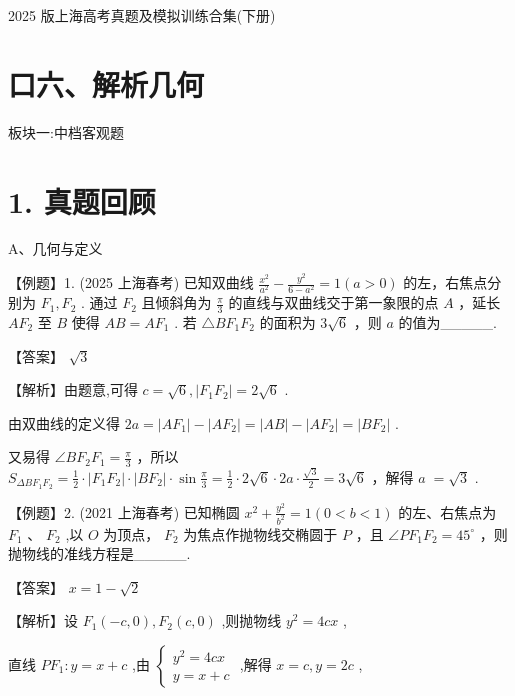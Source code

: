 \documentclass[10pt]{article}
\begin{document}
2025 版上海高考真题及模拟训练合集(下册)

\section*{口六、解析几何}

板块一:中档客观题

\section*{1. 真题回顾}

A、几何与定义

【例题】1. (2025 上海春考) 已知双曲线 \(\frac{{x}^{2}}{{a}^{2}} - \frac{{y}^{2}}{6 - {a}^{2}} = 1\left( {a > 0}\right)\) 的左，右焦点分别为 \({F}_{1},{F}_{2}\) . 通过 \({F}_{2}\) 且倾斜角为 \(\frac{\pi }{3}\) 的直线与双曲线交于第一象限的点 \(A\) ，延长 \(A{F}_{2}\) 至 \(B\) 使得 \({AB} = {A{F}_{1}}\) . 若 \(\bigtriangleup B{F}_{1}{F}_{2}\) 的面积为 \(3\sqrt{6}\) ，则 \(a\) 的值为\_\_\_\_\_.

【答案】 \(\sqrt{3}\)

【解析】由题意,可得 \(c = \sqrt{6},\left| {{F}_{1}{F}_{2}}\right|  = 2\sqrt{6}\) .

由双曲线的定义得 \({2a} = \left| {A{F}_{1}}\right|  - \left| {A{F}_{2}}\right|  = \left| {AB}\right|  - \left| {A{F}_{2}}\right|  = \left| {B{F}_{2}}\right|\) .

又易得 \(\angle B{F}_{2}{F}_{1} = \frac{\pi }{3}\) ，所以 \({S}_{{\Delta B}{F}_{1}{F}_{2}} = \frac{1}{2} \cdot  \left| {{F}_{1}{F}_{2}}\right|  \cdot  \left| {B{F}_{2}}\right|  \cdot  \sin \frac{\pi }{3} = \frac{1}{2} \cdot  2\sqrt{6} \cdot  {2a} \cdot  \frac{\sqrt{3}}{2} = {3\sqrt{6}}\) ，解得 \(a \; = \sqrt{3}\) .

【例题】2. (2021 上海春考) 已知椭圆 \({x}^{2} + \frac{{y}^{2}}{{b}^{2}} = 1\left( {0 < b < 1}\right)\) 的左、右焦点为 \({F}_{1}\text{ 、 }{F}_{2}\) ,以 \(O\) 为顶点， \({F}_{2}\) 为焦点作抛物线交椭圆于 \(P\) ，且 \(\angle {P{F}_{1}{F}_{2}} = {45}^{ \circ  }\) ，则抛物线的准线方程是\_\_\_\_\_.

【答案】 \(x = 1 - \sqrt{2}\)

【解析】设 \({F}_{1}\left( {-c,0}\right) ,{F}_{2}\left( {c,0}\right)\) ,则抛物线 \({y}^{2} = {4cx}\) ,

直线 \(P{F}_{1} : y = x + c\) ,由 \(\left\{  \begin{array}{l} {y}^{2} = {4cx} \\  y = x + c \end{array}\right.\) ,解得 \(x = c,y = {2c}\) ,
\end{document}
